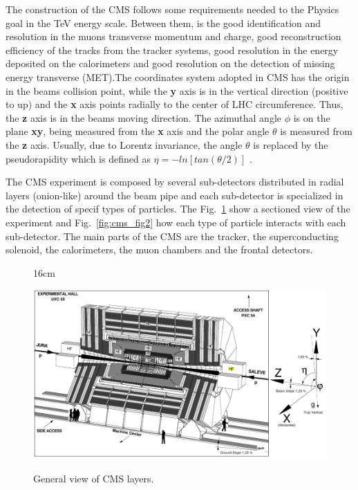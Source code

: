 The construction of the CMS follows some requirements needed to the Physics goal in the TeV energy scale. Between them, is the good identification and resolution in the muons transverse momentum and charge, good reconstruction efficiency of the tracks from the tracker systems, good resolution in the energy deposited on the calorimeters and good resolution on the detection of missing energy transverse (MET).The coordinates system adopted in CMS has the origin in the beams collision point, while the 
\textbf{y} axis is in the vertical direction (positive to up) and the \textbf{x} axis points radially to the center of LHC circumference. Thus, the \textbf{z} axis is in the beams moving direction. The azimuthal angle $\phi$ is on the plane \textbf{xy}, being measured from the \textbf{x} axis and the polar angle $\theta$ is measured from the \textbf{z} axis. Usually, due to Lorentz invariance, the angle $\theta$ is replaced by the pseudorapidity which is defined as $\eta=-ln[tan(\theta/2)]$ \cite{bib:lhc-guide,bib:cms-page}.

The CMS experiment is composed by several sub-detectors distributed in radial layers (onion-like) around the beam pipe and each sub-detector is specialized in the detection of specif types of particles. The Fig.~\ref{fig:cms_fig1} show a sectioned view of the experiment and Fig.~\ref{fig:cms_fig2} how each type of particle interacts with each sub-detector. The main parts of the CMS are the tracker, the superconducting solenoid, the calorimeters, the muon chambers and the frontal detectors.

\begin{figure}[htbp]{16cm}
\caption{General view of CMS layers.}
\centering
\includegraphics[scale=0.9,angle=90]{ChapterCMS/figs/cms_coordinates_system.png}
\label{fig:cms_fig1}
\end{figure}

